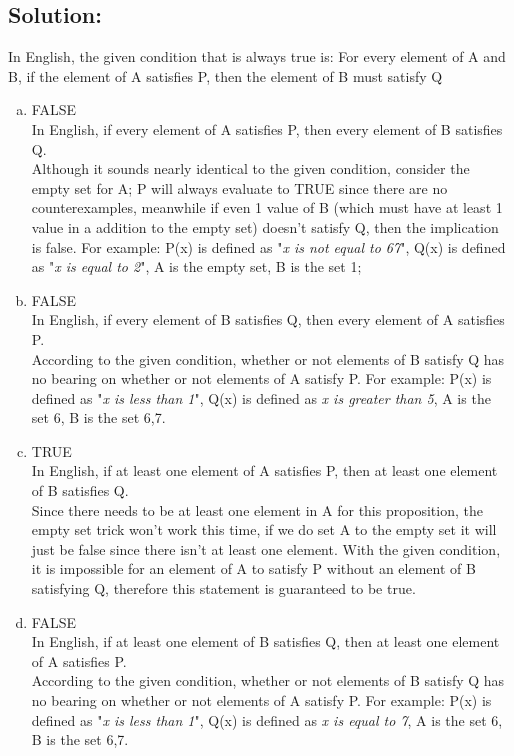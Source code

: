 \documentclass[12pt]{article}
\begin{document}
	\subsection*{\textbf{Solution:}}
	In English, the given condition that is always true is: For every element of A
	and B, if the element of A satisfies P, then the element of B must satisfy Q
	\begin{enumerate}[(a)]
		\item FALSE\\
			In English, if every element of A satisfies P, then every element of B
			satisfies Q.\\
			Although it sounds nearly identical to the given condition, consider the empty
			set for A; P will always evaluate to TRUE since there are no
			counterexamples, meanwhile if even 1 value of B (which must have at least
			1 value in a addition to the empty set) doesn't satisfy Q, then the
			implication is false. For example: P(x) is defined as "\textit{x is not
			equal to 67}", Q(x) is defined as "\textit{x is equal to 2}", A is the
			empty set, B is the set {1};

		\item FALSE\\
			In English, if every element of B satisfies Q, then every element of A
			satisfies P.\\
			According to the given condition, whether or not elements of B satisfy Q has
			no bearing on whether or not elements of A satisfy P. For example: P(x) is
			defined as "\textit{x is less than 1}", Q(x) is defined as \textit{x is
			greater than 5}, A is the set {6}, B is the set {6,7}.

		\item TRUE\\
			In English, if at least one element of A satisfies P, then at least one
			element of B satisfies Q.\\
			Since there needs to be at least one element in A for this proposition, the
			empty set trick won't work this time, if we do set A to the empty set it
			will just be false since there isn't at least one element. With the given condition,
			it is impossible for an element of A to satisfy P without an element of B
			satisfying Q, therefore this statement is guaranteed to be true.

		\item FALSE\\
			In English, if at least one element of B satisfies Q, then at least one
			element of A satisfies P.\\
			According to the given condition, whether or not elements of B satisfy Q has
			no bearing on whether or not elements of A satisfy P. For example: P(x) is
			defined as "\textit{x is less than 1}", Q(x) is defined as \textit{x is
			equal to 7}, A is the set {6}, B is the set {6,7}.
	\end{enumerate}
\end{document}
